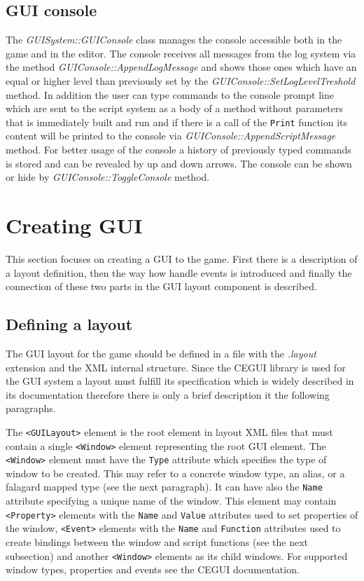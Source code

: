 \subsection{GUI console}
\label{sub:gui-console}

The \emph{GUISystem::GUIConsole} class manages the console accessible both in the game and in the editor. The console receives all messages from the log system via the method \emph{GUIConsole::AppendLogMessage} and shows those ones which have an equal or higher level than previously set by the \emph{GUIConsole::SetLogLevelTreshold} method. In addition the user can type commands to the console prompt line which are sent to the script system as a body of a method without parameters that is immediately built and run and if there is a call of the \verb/Print/ function its content will be printed to the console via \emph{GUIConsole::AppendScriptMessage} method. For better usage of the console a history of previously typed commands is stored and can be revealed by up and down arrows. The console can be shown or hide by \emph{GUIConsole::ToggleConsole} method.

\section{Creating GUI}
\label{sec:gui-creating}

This section focuses on creating a GUI to the game. First there is a description of a layout definition, then the way how handle events is introduced and finally the connection of these two parts in the GUI layout component is described.

\subsection{Defining a layout}

The GUI layout for the game should be defined in a file with the \emph{.layout} extension and the XML internal structure. Since the CEGUI library is used for the GUI system a layout must fulfill its specification which is widely described in its documentation \cite{cegui-doc} therefore there is only a brief description it the following paragraphs.

The \verb/<GUILayout>/ element is the root element in layout XML files that must contain a single \verb/<Window>/ element representing the root GUI element. The \verb/<Window>/ element must have the \verb/Type/ attribute which specifies the type of window to be created. This may refer to a concrete window type, an alias, or a falagard mapped type (see the next paragraph). It can have also the \verb/Name/ attribute specifying a unique name of the window. This element may contain \verb/<Property>/ elements with the \verb/Name/ and \verb/Value/ attributes used to set properties of the window, \verb/<Event>/ elements with the \verb/Name/ and \verb/Function/ attributes used to create bindings between the window and script functions (see the next subsection) and another \verb/<Window>/ elements as its child windows. For supported window types, properties and events see the CEGUI documentation.

